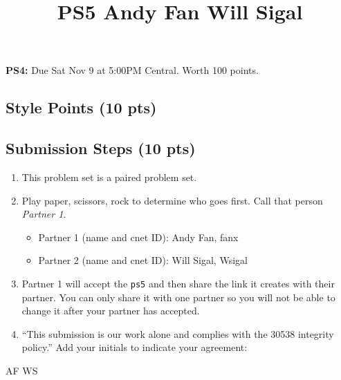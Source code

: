\documentclass[
  letterpaper,
  DIV=11,
  numbers=noendperiod]{scrartcl}
\title{PS5 Andy Fan Will Sigal}
\author{}
\date{}
\providecommand{\tightlist}{%
  \setlength{\itemsep}{0pt}\setlength{\parskip}{0pt}}\usepackage{longtable,booktabs,array}
\begin{document}
\maketitle



\textbf{PS4:} Due Sat Nov 9 at 5:00PM Central. Worth 100 points.

\subsection{Style Points (10 pts)}\label{style-points-10-pts}

\subsection{Submission Steps (10 pts)}\label{submission-steps-10-pts}

\begin{enumerate}
\def\labelenumi{\arabic{enumi}.}
\tightlist
\item
  This problem set is a paired problem set.
\item
  Play paper, scissors, rock to determine who goes first. Call that
  person \emph{Partner 1}.

  \begin{itemize}
  \tightlist
  \item
    Partner 1 (name and cnet ID): Andy Fan, fanx
  \item
    Partner 2 (name and cnet ID): Will Sigal, Wsigal
  \end{itemize}
\item
  Partner 1 will accept the \texttt{ps5} and then share the link it
  creates with their partner. You can only share it with one partner so
  you will not be able to change it after your partner has accepted.
\item
  ``This submission is our work alone and complies with the 30538
  integrity policy.'' Add your initials to indicate your agreement:
\end{enumerate}

AF WS
\end{document}
